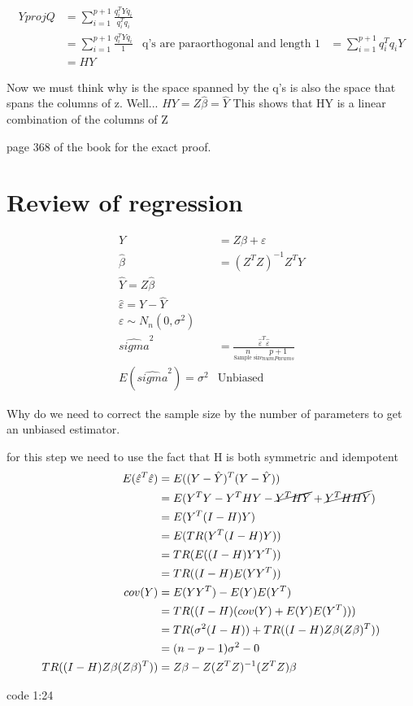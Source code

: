 \begin{align*}
    YprojQ &= \sum_{i=1}^{p+1} \frac{q_i^TYq_i}{q_i^Tq_i}\\
    &= \sum_{i=1}^{p+1} \frac{q_i^TYq_i}{1} &\text{q's are paraorthogonal and length 1}
    &= \sum_{i=1}^{p+1} {q_i^Tq_i}Y \\
    &= HY
\end{align*}

Now we must think why is the space spanned by the q's is also the space that spans the columns of z. Well... $HY = Z\hat{\beta} = \hat{Y}$ This shows that HY is a linear combination of the columns of Z

page 368 of the book for the exact proof.

\section{Review of regression}
\begin{align*}
    Y &= Z\beta +\varepsilon \\
    \hat{\beta} &= (Z^TZ)^{-1}Z^TY \\
    \hat{Y} = Z \hat{\beta}\\
    \hat{\varepsilon} = Y-\hat{Y} \\
    \varepsilon \sim N_n(0,\sigma^2)\\
    \hat{sigma}^2 &= \frac{\hat{\varepsilon}^T\hat{\varepsilon}}{\underset{\text{Sample size}}{n}\underset{numParams}{p+1}}\\
    E(\hat{sigma}^2) = \sigma^2 &\text{Unbiased}
\end{align*}

Why do we need to correct the sample size by the number of parameters to get an unbiased estimator.

for this step we need to use the fact that H is both symmetric and idempotent
\begin{align*}
    E(\hat{\varepsilon}^T\hat{\varepsilon})&= E((Y-\hat{Y})^T(Y-\hat{Y}))\\
    &=E(Y^TY-Y^THY-\cancel{Y^THY}+\cancel{Y^THHY}) \\
    &=E(Y^T(I-H)Y) \\
    &= E(TR(Y^T(I-H)Y))\\
    &= TR(E((I-H)YY^T))\\
    &= TR((I-H)E(YY^T))\\
    cov(Y) &= E(YY^T)-E(Y)E(Y^T)\\
    &= TR((I-H)(cov(Y)+E(Y)E(Y^T)))\\
    &= TR(\sigma^2(I-H))+TR((I-H)Z\beta(Z\beta)^T))\\
    &= (n-p-1)\sigma^2-0\\
    TR((I-H)Z\beta(Z\beta)^T)) &= Z\beta -Z(Z^TZ)^{-1}(Z^TZ)\beta
\end{align*}

code 1:24
